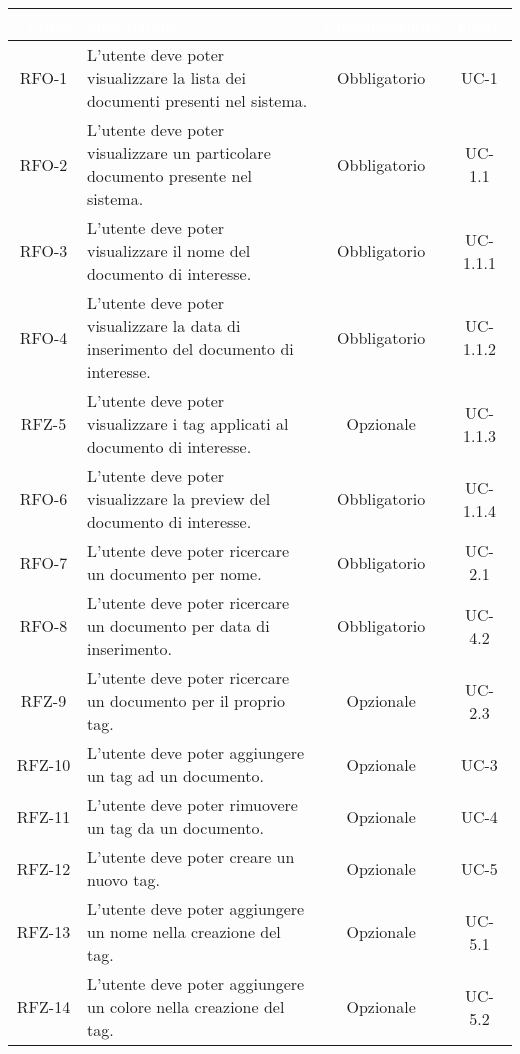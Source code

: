 \begingroup
\setlength{\tabcolsep}{10pt}
\renewcommand{\arraystretch}{1.5}
\begin{xltabular}{\textwidth}{| c | X | c | c |}
    \hline
     \textbf{\textcolor{white}{Codice}} & \textbf{\textcolor{white}{Descrizione}} & \textbf{\textcolor{white}{Classificazione}} & \textbf{\textcolor{white}{Fonte}}\\
    \hline
    \endhead
    RFO-1 & L’utente deve poter visualizzare la lista dei documenti presenti nel sistema. & Obbligatorio & UC-1 \\
    \hline
    RFO-2 & L’utente deve poter visualizzare un particolare documento presente nel sistema. & Obbligatorio & UC-1.1 \\
    \hline
    RFO-3 & L'utente deve poter visualizzare il nome del documento di interesse. & Obbligatorio & UC-1.1.1 \\
    \hline
    RFO-4 & L’utente deve poter visualizzare la data di inserimento del documento di interesse. & Obbligatorio & UC-1.1.2 \\
    \hline
    RFZ-5 & L’utente deve poter visualizzare i tag applicati al documento di interesse. & Opzionale & UC-1.1.3 \\
    \hline
    RFO-6 & L’utente deve poter visualizzare la preview del documento di interesse. & Obbligatorio & UC-1.1.4 \\
    \hline
    RFO-7 & L’utente deve poter ricercare un documento per nome. & Obbligatorio & UC-2.1 \\
    \hline
    RFO-8 & L’utente deve poter ricercare un documento per data di inserimento. & Obbligatorio & UC-4.2 \\
    \hline
    RFZ-9 & L’utente deve poter ricercare un documento per il proprio tag. & Opzionale & UC-2.3 \\
    \hline
    RFZ-10 & L’utente deve poter aggiungere un tag ad un documento. & Opzionale & UC-3 \\
    \hline
    RFZ-11 & L’utente deve poter rimuovere un tag da un documento. & Opzionale & UC-4 \\
    \hline
    RFZ-12 & L’utente deve poter creare un nuovo tag. & Opzionale & UC-5 \\
    \hline
    RFZ-13 & L’utente deve poter aggiungere un nome nella creazione del tag. & Opzionale & UC-5.1 \\
    \hline
    RFZ-14 & L’utente deve poter aggiungere un colore nella creazione del tag. & Opzionale & UC-5.2 \\

\end{xltabular}
